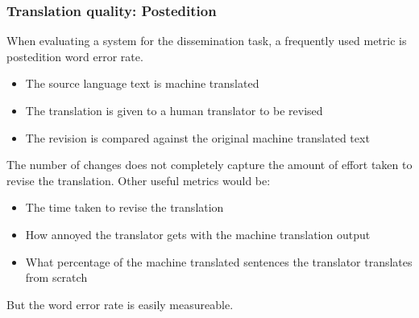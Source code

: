 \documentclass[10pt,xetex]{beamer} %
\begin{document}
\begin{frame}
  \frametitle{Translation quality: Postedition}

When evaluating a system for the dissemination task, a frequently used metric is 
postedition word error rate.

\begin{itemize}
  \item The source language text is machine translated
  \item The translation is given to a human translator to be revised
  \item The revision is compared against the original machine translated text
\end{itemize}

The number of changes does not completely capture the amount of effort taken to revise
the translation. Other useful metrics would be:

\begin{itemize}
  \item The time taken to revise the translation
  \item How annoyed the translator gets with the machine translation output
  \item What percentage of the machine translated sentences the translator
    translates from scratch
\end{itemize}

But the word error rate is easily measureable.

\end{frame}
\end{document}
